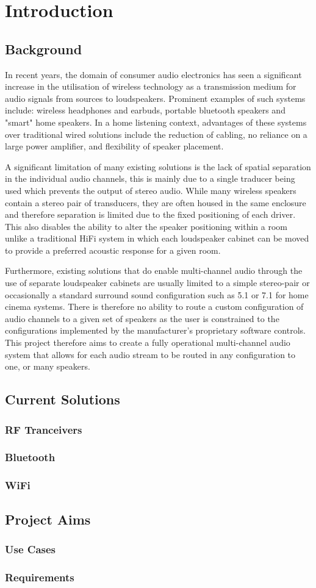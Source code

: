 \documentclass[main.tex]{subfiles}
\begin{document}
\chapter{Introduction}
\section{Background}
In recent years, the domain of consumer audio electronics has seen a significant increase in the utilisation of wireless technology as a transmission medium for audio signals from sources to loudspeakers.
Prominent examples of such systems include: wireless headphones and earbuds, portable bluetooth speakers and "smart" home speakers. 
In a home listening context, advantages of these systems over traditional wired solutions include the reduction of cabling, no reliance on a large power amplifier, and flexibility of speaker placement.

\medskip
A significant limitation of many existing solutions is the lack of spatial separation in the individual audio channels, this is mainly due to a single traducer being used which prevents the output of stereo audio.
While many wireless speakers contain a stereo pair of transducers, they are often housed in the same enclosure and therefore separation is limited due to the fixed positioning of each driver.
This also disables the ability to alter the speaker positioning within a room unlike a traditional HiFi system in which each loudspeaker cabinet can be moved to provide a preferred acoustic response for a given room. 

\medskip
Furthermore, existing solutions that do enable multi-channel audio through the use of separate loudspeaker cabinets are usually limited to a simple stereo-pair or occasionally a standard surround sound configuration such as 5.1 or 7.1 for home cinema systems.
There is therefore no ability to route a custom configuration of audio channels to a given set of speakers as the user is constrained to the configurations implemented by the manufacturer's proprietary software controls. 
This project therefore aims to create a fully operational multi-channel audio system that allows for each audio stream to be routed in any configuration to one, or many speakers.


\section{Current Solutions}
\subsection{RF Tranceivers}
\subsection{Bluetooth}
\subsection{WiFi}

\section{Project Aims}
\subsection{Use Cases}
\subsection{Requirements}
\end{document}
